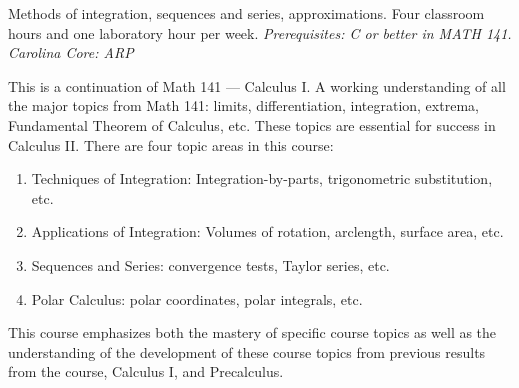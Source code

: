\documentclass[11pt,letterpaper]{article}
\begin{document}

Methods of integration, sequences and series, approximations. Four classroom hours and one laboratory hour per week. {\itshape Prerequisites: C or better in MATH 141. Carolina Core: ARP}
\sectionbreak




This is a continuation of Math 141 --- Calculus I. A working understanding of all the major topics from Math 141: limits, differentiation, integration, extrema, Fundamental Theorem of Calculus, etc. These topics are essential for success in Calculus II. There are four topic areas in this course: \par
	\begin{enumerate}
	\item[I.] Techniques of Integration: Integration-by-parts, trigonometric substitution, etc.
	\item[II.] Applications of Integration: Volumes of rotation, arclength, surface area, etc.
	\item[III.] Sequences and Series: convergence tests, Taylor series, etc.
	\item[IV.] Polar Calculus: polar coordinates, polar integrals, etc.
	\end{enumerate} \par
This course emphasizes both the mastery of specific course topics as well as the understanding of the development of these course topics from previous results from the course, Calculus I, and Precalculus.
\sectionbreak



\end{document}
